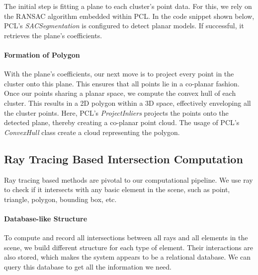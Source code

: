 \documentclass[11pt, a4paper,oneside,chapterprefix=false]{scrbook}
\begin{document}
The initial step is fitting a plane to each cluster's point data. For this, we rely on the RANSAC algorithm \cite{RANSAC} embedded within PCL. In the code snippet shown below, PCL's \emph{SACSegmentation} \cite{pcl_planar_segmentation_2023} is configured to detect planar models. If successful, it retrieves the plane's coefficients.

\paragraph{Formation of Polygon}

With the plane's coefficients, our next move is to project every point in the cluster onto this plane. This ensures that all points lie in a co-planar fashion. Once our points sharing a planar space, we compute the convex hull of each cluster. This results in a 2D polygon within a 3D space, effectively enveloping all the cluster points. Here, PCL's \emph{ProjectInliers} projects the points onto the detected plane, thereby creating a co-planar point cloud. The usage of PCL's \emph{ConvexHull} \cite{cormen2001introduction} class create a cloud representing the polygon.


\subsection{Ray Tracing Based Intersection Computation} \label{sec:ray tracing}

Ray tracing based methods are pivotal to our computational pipeline. We use ray to check if it intersects with any basic element in the scene, such as point, triangle, polygon, bounding box, etc.

\paragraph{Database-like Structure}

To compute and record all intersections between all rays and all elements in the scene, we build different structure for each type of element. Their interactions are also stored, which makes the system appears to be a relational database. We can query this database to get all the information we need.  
\end{document}
